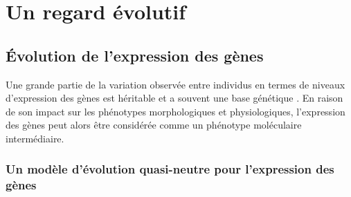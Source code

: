 \chapter{Un regard évolutif}
{\hypersetup{linkcolor=GREYDARK}\minitoc}
\label{chap:evolution}

\section{Évolution de l’expression des gènes}
\label{sec:evolution-gene}

Une grande partie de la variation observée entre individus en termes de niveaux d'expression des gènes est héritable et a souvent une base génétique \citep{emilsson_genetics_2008,aguet_genetic_2017}. En raison de son impact sur les phénotypes morphologiques et physiologiques, l’expression des gènes peut alors être considérée comme un phénotype moléculaire intermédiaire.

\subsection{Un modèle d’évolution quasi-neutre pour l’expression des gènes}
\label{subsec:modele-neutre}

